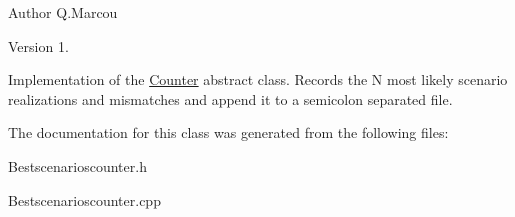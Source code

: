 \begin{DoxyAuthor}{Author}
Q.\+Marcou 
\end{DoxyAuthor}
\begin{DoxyVersion}{Version}
1.
\end{DoxyVersion}
Implementation of the \hyperlink{classCounter}{Counter} abstract class. Records the N most likely scenario realizations and mismatches and append it to a semicolon separated file. 

The documentation for this class was generated from the following files\+:\begin{DoxyCompactItemize}
\item 
Bestscenarioscounter.\+h\item 
Bestscenarioscounter.\+cpp\end{DoxyCompactItemize}
